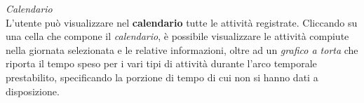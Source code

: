 \documentclass{article}
\begin{document}
\begin{center}
    \begin{figure}[H]
        \centering
    \end{figure}
\end{center}
\textit{Calendario} \vspace*{7pt}\\
L'utente può visualizzare nel \textbf{calendario} tutte le attività registrate. Cliccando su una cella che compone il \textit{calendario}, è possibile visualizzare le attività compiute nella giornata selezionata e le relative informazioni, oltre ad un \textit{grafico a torta} che riporta il tempo speso per i vari tipi di attività durante l'arco temporale prestabilito, specificando la porzione di tempo di cui non si hanno dati a disposizione. 
\end{document}
